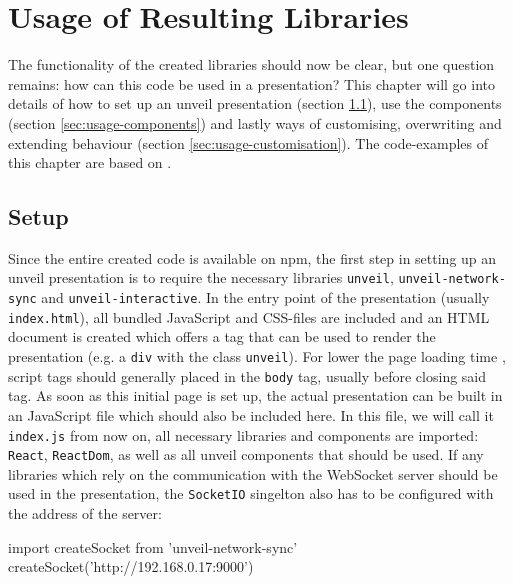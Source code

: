 \chapter{Usage of Resulting Libraries}
\label{cha:usage}

The functionality of the created libraries should now be clear, but one question remains: how can this code be used in a presentation? This chapter will go into details of how to set up an unveil presentation (section \ref{sec:usage-setup}), use the components (section \ref{sec:usage-components}) and lastly ways of customising, overwriting and extending behaviour (section \ref{sec:usage-customisation}). The code-examples of this chapter are based on \cite{unveil-client-server}.

\section{Setup}
\label{sec:usage-setup}

Since the entire created code is available on npm, the first step in setting up an unveil presentation is to require the necessary libraries \texttt{unveil}, \texttt{unveil-network-sync} and \texttt{unveil-interactive}. In the entry point of the presentation (usually \texttt{index.html}), all bundled JavaScript and CSS-files are included and an HTML document is created which offers a tag that can be used to render the presentation (e.g. a \texttt{div} with the class \texttt{unveil}). For lower the page loading time \cite{yahoo-speeding-up-website}, script tags should generally placed in the \texttt{body} tag, usually before closing said tag.
As soon as this initial page is set up, the actual presentation can be built in an JavaScript file which should also be included here.
In this file, we will call it \texttt{index.js} from now on, all necessary libraries and components are imported:  \texttt{React}, \texttt{ReactDom}, as well as all unveil components that should be used. If any libraries which rely on the communication with the WebSocket server should be used in the presentation, the \texttt{SocketIO} singelton also has to be configured with the address of the server:
\begin{GenericCode}
import { createSocket } from 'unveil-network-sync'
createSocket('http://192.168.0.17:9000')
\end{GenericCode}

